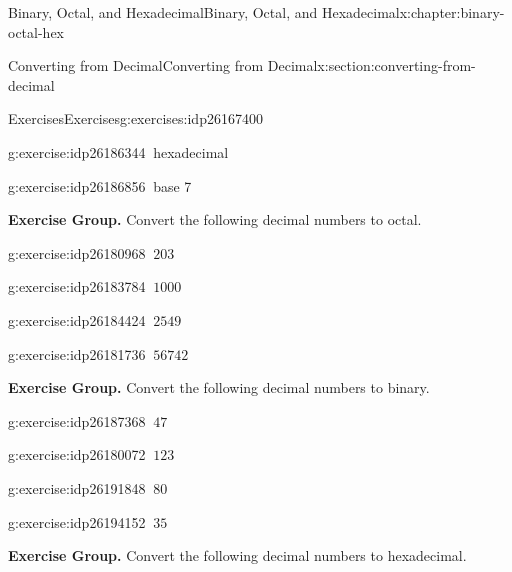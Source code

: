 \documentclass[twoside,10pt,]{book}
\numberwithin{equation}{section}
\begin{document}
\begin{chapterptx}{Binary, Octal, and Hexadecimal}{}{Binary, Octal, and Hexadecimal}{}{}{x:chapter:binary-octal-hex}
\begin{sectionptx}{Converting from Decimal}{}{Converting from Decimal}{}{}{x:section:converting-from-decimal}
\begin{exercises-subsection}{Exercises}{}{Exercises}{}{}{g:exercises:idp26167400}
\begin{exercisegroup}
\begin{divisionexerciseeg}{15}{}{}{g:exercise:idp26186344}
\(\ \)hexadecimal\end{divisionexerciseeg}%
\begin{divisionexerciseeg}{16}{}{}{g:exercise:idp26186856}%
\(\ \)base 7\end{divisionexerciseeg}%
\end{exercisegroup}
\par\medskip\noindent
\par\medskip\noindent%
\textbf{Exercise Group.}\space\space%
Convert the following decimal numbers to octal.\begin{exercisegroup}
\begin{divisionexerciseeg}{17}{}{}{g:exercise:idp26180968}%
\(\ 203\)\end{divisionexerciseeg}%
\begin{divisionexerciseeg}{18}{}{}{g:exercise:idp26183784}%
\(\ 1000\)\end{divisionexerciseeg}%
\begin{divisionexerciseeg}{19}{}{}{g:exercise:idp26184424}%
\(\ 2549\)\end{divisionexerciseeg}%
\begin{divisionexerciseeg}{20}{}{}{g:exercise:idp26181736}%
\(\ 56742\)\end{divisionexerciseeg}%
\end{exercisegroup}
\par\medskip\noindent
\par\medskip\noindent%
\textbf{Exercise Group.}\space\space%
Convert the following decimal numbers to binary.\begin{exercisegroup}
\begin{divisionexerciseeg}{21}{}{}{g:exercise:idp26187368}%
\(\ 47\)\end{divisionexerciseeg}%
\begin{divisionexerciseeg}{22}{}{}{g:exercise:idp26180072}%
\(\ 123\)\end{divisionexerciseeg}%
\begin{divisionexerciseeg}{23}{}{}{g:exercise:idp26191848}%
\(\ 80\)\end{divisionexerciseeg}%
\begin{divisionexerciseeg}{24}{}{}{g:exercise:idp26194152}%
\(\ 35\)\end{divisionexerciseeg}%
\end{exercisegroup}
\par\medskip\noindent
\par\medskip\noindent%
\textbf{Exercise Group.}\space\space%
Convert the following decimal numbers to hexadecimal.\begin{exercisegroup}

\end{exercisegroup}
\end{exercises-subsection}
\end{sectionptx}
\end{chapterptx}
\end{document}
